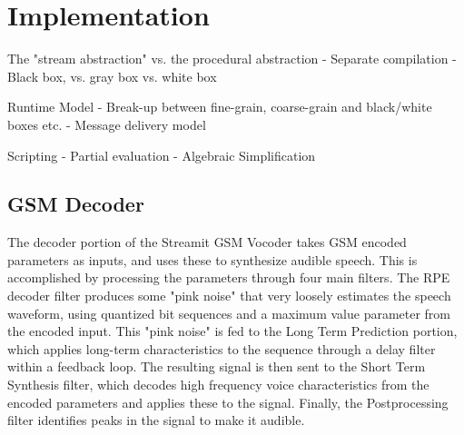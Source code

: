 \section{Implementation}

The "stream abstraction" vs. the procedural abstraction
-	Separate compilation
-	Black box, vs. gray box vs. white box

Runtime Model
-	Break-up between fine-grain, coarse-grain and black/white boxes etc.
-	Message delivery model

Scripting
-	Partial evaluation
-	Algebraic Simplification 


\subsection{GSM Decoder}

  The decoder portion of the Streamit GSM Vocoder takes GSM encoded
parameters as inputs, and uses these to synthesize audible speech.  This
is accomplished by processing the parameters through four main filters.
The RPE decoder filter produces some "pink noise" that very loosely
estimates the speech waveform, using quantized bit sequences and a
maximum value parameter from the encoded input.  This "pink noise" is
fed to the Long Term Prediction portion, which applies long-term
characteristics to the sequence through a delay filter within a feedback
loop.  The resulting signal is then sent to the Short Term Synthesis
filter, which decodes high frequency voice characteristics from the
encoded parameters and applies these to the signal.  Finally, the
Postprocessing filter identifies peaks in the signal to make it audible.

